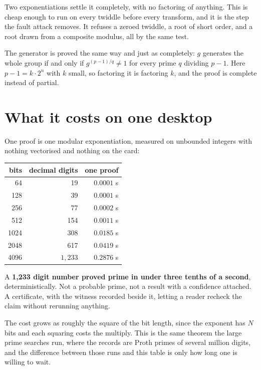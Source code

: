 Two exponentiations settle it completely, with no factoring of anything. This is cheap enough to run on every twiddle before every transform, and it is the step the fault attack removes. It refuses a zeroed twiddle, a root of short order, and a root drawn from a composite modulus, all by the same test.

The generator is proved the same way and just as completely: \(g\) generates the whole group if and only if \(g^{(p-1)/q} \ne 1\) for every prime \(q\) dividing \(p-1\). Here \(p - 1 = k \cdot 2^n\) with \(k\) small, so factoring it is factoring \(k\), and the proof is complete instead of partial.

\section{What it costs on one desktop}

One proof is one modular exponentiation, measured on unbounded integers with nothing vectorised and nothing on the card:

\begin{center}
\begin{tabular}{@{}rrr@{}}
\toprule
bits & decimal digits & one proof \\
\midrule
64 & 19 & \(0.0001\) s \\
128 & 39 & \(0.0001\) s \\
256 & 77 & \(0.0002\) s \\
512 & 154 & \(0.0011\) s \\
1024 & 308 & \(0.0185\) s \\
2048 & 617 & \(0.0419\) s \\
4096 & \(1{,}233\) & \(0.2876\) s \\
\bottomrule
\end{tabular}
\end{center}

A \textbf{1,233 digit number proved prime in under three tenths of a second}, deterministically. Not a probable prime, not a result with a confidence attached. A certificate, with the witness recorded beside it, letting a reader recheck the claim without rerunning anything.

The cost grows as roughly the square of the bit length, since the exponent has \(N\) bits and each squaring costs the multiply. This is the same theorem the large prime searches run, where the records are Proth primes of several million digits, and the difference between those runs and this table is only how long one is willing to wait.

